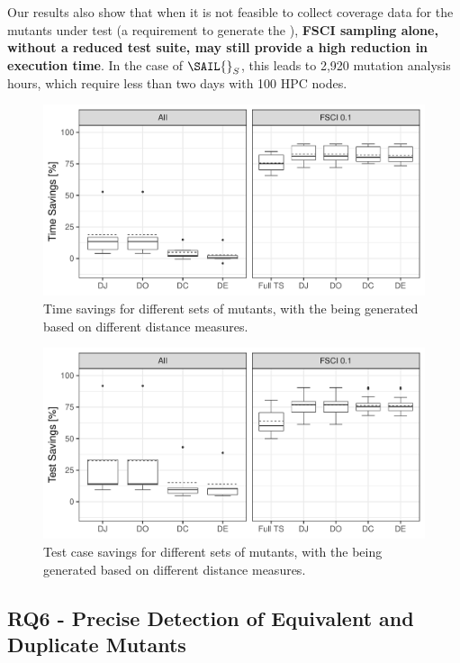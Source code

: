Our results also show that when it is not feasible to collect coverage data for the mutants under test (a requirement to generate the \MPTS), \textbf{FSCI sampling alone, without a reduced test suite, may still provide a high reduction in execution time}. In the case of $\mathit{\SAIL{}}_S$, this leads to 2,920 mutation analysis hours, which require less than two days with 100 HPC nodes.



\begin{figure}[tb]
\begin{center}
\includegraphics[width=0.8\columnwidth]{images/times.pdf}
\caption{Time savings for different sets of mutants, with the \MPTS being generated based on different distance measures.}
\label{fig:results:time:saving}
\end{center}
\end{figure}

\begin{figure}[tb]
\begin{center}
\includegraphics[width=0.8\columnwidth]{images/tests.pdf}
\caption{Test case savings for different sets of mutants, with the \MPTS being generated based on different distance measures.}
\label{fig:results:test:saving}
\end{center}
\end{figure}




\subsection{RQ6 - Precise Detection of Equivalent and Duplicate Mutants}
\label{sec:empirical:thrshold}
